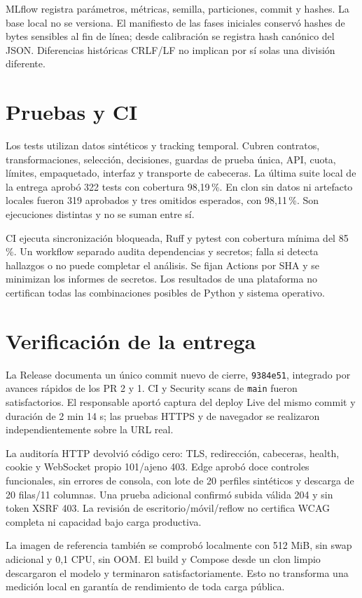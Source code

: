 \documentclass[11pt,a4paper,oneside]{report}
\newcommand{\versioncodigo}{9384e51}
\begin{document}
MLflow registra parámetros, métricas, semilla, particiones, commit y hashes.
La base local no se versiona. El manifiesto de las fases iniciales conservó
hashes de bytes sensibles al fin de línea; desde calibración se registra
hash canónico del JSON. Diferencias históricas CRLF/LF no implican por sí
solas una división diferente.

\section{Pruebas y CI}
Los tests utilizan datos sintéticos y tracking temporal. Cubren contratos,
transformaciones, selección, decisiones, guardas de prueba única, API,
cuota, límites, empaquetado, interfaz y transporte de cabeceras. La última
suite local de la entrega aprobó 322 tests con cobertura 98,19\,\%. En clon
sin datos ni artefacto locales fueron 319 aprobados y tres omitidos esperados,
con 98,11\,\%. Son ejecuciones distintas y no se suman entre sí.

CI ejecuta sincronización bloqueada, Ruff y pytest con cobertura mínima del
85\,\%. Un workflow separado audita dependencias y secretos; falla si detecta
hallazgos o no puede completar el análisis. Se fijan Actions por SHA y se
minimizan los informes de secretos. Los resultados de una plataforma no
certifican todas las combinaciones posibles de Python y sistema operativo.

\section{Verificación de la entrega}
La Release documenta un único commit nuevo de cierre, \texttt{\versioncodigo},
integrado por avances rápidos de los PR 2 y 1. CI y Security scans de
\texttt{main} fueron satisfactorios. El responsable aportó captura del deploy
Live del mismo commit y duración de 2 min 14 s; las pruebas HTTPS y de
navegador se realizaron independientemente sobre la URL real.

La auditoría HTTP devolvió código cero: TLS, redirección, cabeceras, health,
cookie y WebSocket propio 101/ajeno 403. Edge aprobó doce controles funcionales,
sin errores de consola, con lote de 20 perfiles sintéticos y descarga de 20
filas/11 columnas. Una prueba adicional confirmó subida válida 204 y sin
token XSRF 403. La revisión de escritorio/móvil/reflow no certifica WCAG
completa ni capacidad bajo carga productiva.

La imagen de referencia también se comprobó localmente con 512 MiB, sin
swap adicional y 0,1 CPU, sin OOM. El build y Compose desde un clon limpio
descargaron el modelo y terminaron satisfactoriamente. Esto no transforma
una medición local en garantía de rendimiento de toda carga pública.
\end{document}
